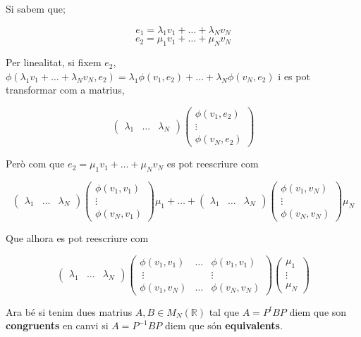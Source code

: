 \documentclass[12pt]{article}
\newcommand{\R}{\mathbb{R}}
\begin{document}
Si sabem que;

\[e_1 = \lambda_1v_1 + \dots + \lambda_Nv_N\]
\[e_2 = \mu_1v_1 + \dots + \mu_Nv_N\]

Per linealitat, si fixem $e_2$, $\phi(\lambda_1v_1 + \dots + \lambda_Nv_N, e_2) = \lambda_1 \phi(v_1,e_2) +\dots + \lambda_N \phi(v_N, e_2)$ i es pot transformar com a matrius,

\[\begin{pmatrix}
    \lambda_1 &\dots&\lambda_N
\end{pmatrix} \begin{pmatrix}
    \phi(v_1, e_2)\\
    \vdots\\
    \phi(v_N, e_2)
\end{pmatrix}\]

Però com que $e_2 = \mu_1 v_1 +\dots+ \mu_N v_N$ es pot reescriure com

\[\begin{pmatrix}
    \lambda_1 &\dots&\lambda_N
\end{pmatrix} \begin{pmatrix}
    \phi(v_1, v_1)\\
    \vdots\\
    \phi(v_N, v_1)
\end{pmatrix}\mu_1 + \dots+\begin{pmatrix}
    \lambda_1 &\dots&\lambda_N
\end{pmatrix} \begin{pmatrix}
    \phi(v_1, v_N)\\
    \vdots\\
    \phi(v_N, v_N)
\end{pmatrix}\mu_N\]

Que alhora es pot reescriure com

\[\begin{pmatrix}
    \lambda_1 &\dots&\lambda_N
\end{pmatrix} \begin{pmatrix}
    \phi(v_1, v_1) & \dots & \phi(v_1, v_1)  \\\
    \vdots&&\vdots\\
    \phi(v_1, v_N) &\dots & \phi(v_N, v_N) 
\end{pmatrix}\begin{pmatrix}
    \mu_1\\
    \vdots \\
    \mu_N
\end{pmatrix}\]

Ara bé si tenim dues matrius $A,B \in M_N (\R)$ tal que $A = P^t BP$ diem que son \textbf{congruents} en canvi si $A = P^{-1}BP$ diem que són \textbf{equivalents}.
\end{document}
